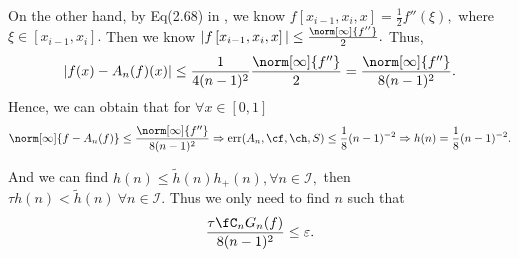 On the other hand, by Eq(2.68) in \cite{walter},
we know
$f\left[x_{i-1},x_{i},x\right]=\frac{1}{2}f''(\xi),$ where $\xi \in [x_{i-1},x_{i}].$
Then we know
$
|f\left[x_{i-1},x_{i},x\right] |\leq \frac{\norm[\infty]{f''}}{2}.$
Thus,
$$
|f(x)-A_{n}(f)(x)|\leq \frac{1}{4(n-1)^2}\frac{\norm[\infty]{f''}}{2}=\frac{\norm[\infty]{f''}}{8(n-1)^2}.
$$
Hence, we can obtain that for $\forall x \in [0,1]$
$$\norm[\infty]{f-A_{n}(f)} \leq  \frac{\norm[\infty]{f''}}{8(n-1)^{2}} \Rightarrow \err(A_n,\cf,\ch,S) \leq \frac{1}{8}(n-1)^{-2}
\Rightarrow h(n)=\frac{1}{8}(n-1)^{-2}.$$



%
%
%
%
%

And we can find  $h(n) \leq \tilde{h}(n) h_{+}(n), \forall n \in \mathcal{I},$ then $ \tau h(n)< \tilde{h}(n) \ \forall n \in \mathcal{I}.$
Thus we only need to find $n$ such that  \[
\frac{\tau \fC_n G_{n}(f)}{8(n-1)^2} \le \varepsilon.
\]

